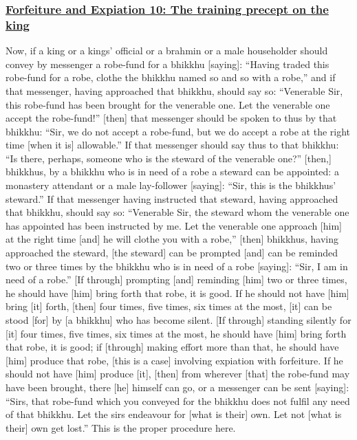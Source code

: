 \subsubsection*{\hyperref[np10]{Forfeiture and Expiation 10: The training precept on the king}}
\label{forf-exp10}

Now, if a king or a kings' official or a brahmin or a male householder should convey by messenger a robe-fund for a bhikkhu [saying]: ``Having traded this robe-fund for a robe, clothe the bhikkhu named so and so with a robe,'' and if that messenger, having approached that bhikkhu, should say so: ``Venerable Sir, this robe-fund has been brought for the venerable one. Let the venerable one accept the robe-fund!'' [then] that messenger should be spoken to thus by that bhikkhu: ``Sir, we do not accept a robe-fund, but we do accept a robe at the right time [when it is] allowable.'' If that messenger should say thus to that bhikkhu: ``Is there, perhaps, someone who is the steward of the venerable one?'' [then,] bhikkhus, by a bhikkhu who is in need of a robe a steward can be appointed: a monastery attendant or a male lay-follower [saying]: ``Sir, this is the bhikkhus' steward.'' If that messenger having instructed that steward, having approached that bhikkhu, should say so: ``Venerable Sir, the steward whom the venerable one has appointed has been instructed by me. Let the venerable one approach [him] at the right time [and] he will clothe you with a robe,'' [then] bhikkhus, having approached the steward, [the steward] can be prompted [and] can be reminded two or three times by the bhikkhu who is in need of a robe [saying]: ``Sir, I am in need of a robe.'' [If through] prompting [and] reminding [him] two or three times, he should have [him] bring forth that robe, it is good. If he should not have [him] bring [it] forth, [then] four times, five times, six times at the most, [it] can be stood [for] by [a bhikkhu] who has become silent. [If through] standing silently for [it] four times, five times, six times at the most, he should have [him] bring forth that robe, it is good; if [through] making effort more than that, he should have [him] produce that robe, [this is a case] involving expiation with forfeiture. If he should not have [him] produce [it], [then] from wherever [that] the robe-fund may have been brought, there [he] himself can go, or a messenger can be sent [saying]: ``Sirs, that robe-fund which you conveyed for the bhikkhu does not fulfil any need of that bhikkhu. Let the sirs endeavour for [what is their] own. Let not [what is their] own get lost.'' This is the proper procedure here.

